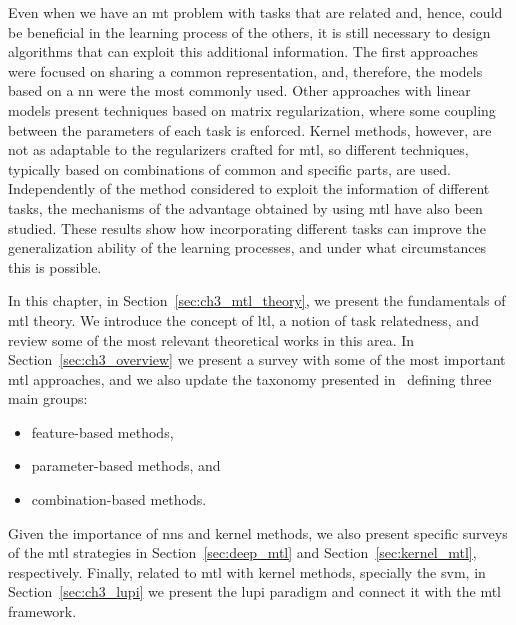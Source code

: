 Even when we have an \acrshort{mt} problem with tasks that are related and, hence, could be beneficial in the learning process of the others, it is still necessary to design algorithms that can exploit this additional information. 
The first approaches~\citep{Caruana97} were focused on sharing a common representation, and, therefore, the models based on a \acrfull{nn} were the most commonly used. Other approaches with linear models present techniques based on matrix regularization, where some coupling between the parameters of each task is enforced. Kernel methods, however, are not as adaptable to the regularizers crafted for \acrshort{mtl}, so different techniques, typically based on combinations of common and specific parts, are used.
Independently of the method considered to exploit the information of different tasks, the mechanisms of the advantage obtained by using \acrshort{mtl} have also been studied. These results show how incorporating different tasks can improve the generalization ability of the learning processes, and under what circumstances this is possible.

In this chapter, in Section~\ref{sec:ch3_mtl_theory}, we present the fundamentals of \acrshort{mtl} theory. We introduce the concept of \acrfull{ltl}, a notion of task relatedness, and review some of the most relevant theoretical works in this area. 
%
In Section~\ref{sec:ch3_overview} we present a survey with some of the most important \acrshort{mtl} approaches, and we also update the taxonomy presented in~\cite{ZhangY17aa} defining three main groups: 
\begin{itemize}
    \item feature-based methods,
    \item parameter-based methods, and
    \item combination-based methods.
\end{itemize}
Given the importance of \acrfull{nns} and kernel methods, we also present specific surveys of the \acrshort{mtl} strategies in Section~\ref{sec:deep_mtl} and Section~\ref{sec:kernel_mtl}, respectively.
Finally, related to \acrshort{mtl} with kernel methods, specially the \acrfull{svm}, in Section~\ref{sec:ch3_lupi} we present the \acrfull{lupi} paradigm and connect it with the \acrshort{mtl} framework.
%







